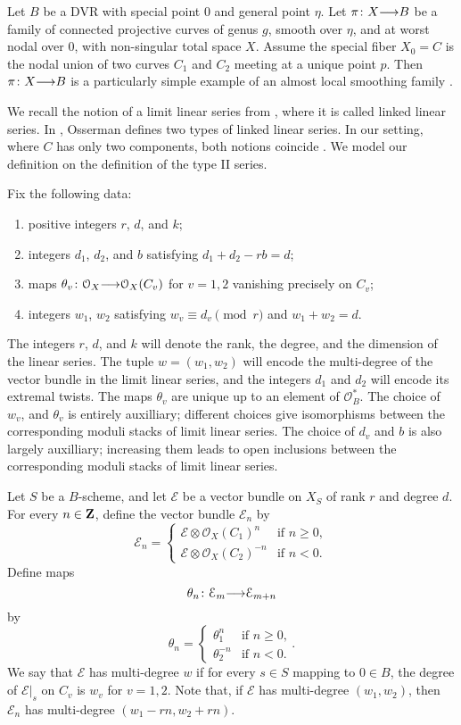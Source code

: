 \documentclass[11pt,reqno]{amsart}
\theoremstyle{plain}
\theoremstyle{definition}
\theoremstyle{remark}
\numberwithin{equation}{section}
\renewcommand{\to}{{\longrightarrow}}
\numberwithin{equation}{section}
\renewcommand{\O}{\mathcal O}
\begin{document}
Let $B$ be a DVR with special point $0$ and general point $\eta$.
Let $\pi \from X \to B$ be a family of connected projective curves of genus $g$, smooth over $\eta$, and at worst nodal over $0$, with non-singular total space $X$.
Assume the special fiber $X_0 = C$ is the nodal union of two curves $C_1$ and $C_2$ meeting at a unique point $p$.
Then $\pi \from X \to B$ is a particularly simple example of an almost local smoothing family \cite[\S~2.1--2.2]{oss:14}.

We recall the notion of a limit linear series from \cite{oss:14}, where it is called linked linear series.
In \cite{oss:14}, Osserman defines two types of linked linear series.
In our setting, where $C$ has only two components, both notions coincide \cite[Remark~3.4.15]{oss:14}.
We model our definition on the definition of the type II series.

Fix the following data:
\begin{enumerate}
\item positive integers $r$, $d$, and $k$;
\item integers $d_1$, $d_2$, and $b$ satisfying $d_1 + d_2 - rb = d$;
\item maps $\theta_v \from \O_X \to \O_X(C_v)$ for $v = 1, 2$ vanishing precisely on $C_v$;
\item integers $w_1$, $w_2$ satisfying $w_v \equiv d_v \pmod r$ and $w_1 + w_2 = d$.
\end{enumerate}
The integers $r$, $d$, and $k$ will denote the rank, the degree, and the dimension of the linear series.
The tuple $w = (w_1, w_2)$ will encode the multi-degree of the vector bundle in the limit linear series, and the integers $d_1$ and $d_2$ will encode its extremal twists.
The maps $\theta_v$ are unique up to an element of $\O_B^*$.
The choice of $w_v$, and $\theta_v$ is entirely auxilliary; different choices give isomorphisms between the corresponding moduli stacks of limit linear series.
The choice of $d_v$ and $b$ is also largely auxilliary; increasing them leads to open inclusions between the corresponding moduli stacks of limit linear series.

Let $S$ be a $B$-scheme, and let $\mathcal E$ be a vector bundle on $X_S$ of rank $r$ and degree $d$.
For every $n \in {\bf Z}$, define the vector bundle $\mathcal E_n$ by
\[ \mathcal E_n =
  \begin{cases}
    \mathcal E \otimes \O_X(C_1)^{n} & \text{if $n \geq 0$},\\
    \mathcal E \otimes \O_X(C_2)^{-n}  & \text{if $n < 0$}.
  \end{cases}
\]
Define maps
\[ \theta_n \from \mathcal E_{m} \to \mathcal E_{m+n}\]
by
\[
  \theta_n = 
  \begin{cases}
    \theta_1^n & \text{if $n \geq 0$,} \\
    \theta_2^{-n} & \text{if $n < 0$.}
  \end{cases}.
\]
We say that $\mathcal E$ has multi-degree $w$ if for every $s \in S$ mapping to $0 \in B$, the degree of $\mathcal E|_s$ on $C_v$ is $w_v$ for $v = 1, 2$.
Note that, if $\mathcal E$ has multi-degree $(w_1, w_2)$, then $\mathcal E_n$ has multi-degree $(w_1-rn, w_2+rn)$.
\end{document}
